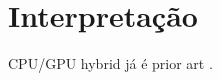 \section{Interpretação}
 CPU/GPU hybrid já é prior art \cite{kamahori2025fiddler,chen2025ktransformers}.
